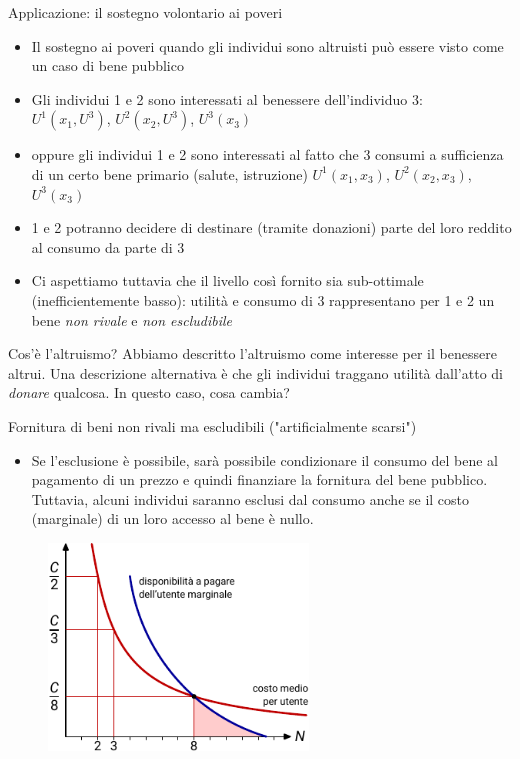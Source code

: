\documentclass[aspectratio=64,11pt]{beamer}
\begin{document}
\begin{frame}{Applicazione: il sostegno volontario ai poveri}
\begin{itemize}
\item Il sostegno ai poveri quando gli individui sono altruisti può essere visto
come un caso di bene pubblico
\item Gli individui 1 e 2 sono interessati al benessere dell'individuo 3:\\[0pt]
$U^1(x_1,U^3)$, $U^2(x_2,U^3)$, $U^3(x_3)$
\item oppure gli individui 1 e 2 sono interessati al fatto che 3 consumi a
sufficienza di un certo bene primario (salute, istruzione)
$U^1(x_1,x_3)$, $U^2(x_2,x_3)$, $U^3(x_3)$
\item 1 e 2 potranno decidere di destinare (tramite donazioni) parte del loro
reddito al consumo da parte di 3
\item Ci aspettiamo tuttavia che il livello così fornito sia sub-ottimale
(inefficientemente basso): utilità e consumo di 3 rappresentano per 1 e 2 un
bene \emph{non rivale} e \emph{non escludibile}
\end{itemize}

\begin{block}{Cos'è l'altruismo?}
Abbiamo descritto l'altruismo come interesse per il benessere altrui.  Una
descrizione alternativa è che gli individui traggano utilità dall'atto di
\emph{donare} qualcosa.  In questo caso, cosa cambia?
\end{block}
\end{frame}

\begin{frame}{Fornitura di beni non rivali ma escludibili ("artificialmente scarsi")}
\begin{itemize}
\item Se l'esclusione è possibile, sarà possibile condizionare il consumo del bene
al pagamento di un prezzo e quindi finanziare la fornitura del bene
pubblico.  Tuttavia, alcuni individui saranno esclusi dal consumo anche se
il costo (marginale) di un loro accesso al bene è nullo.
\end{itemize}
\begin{figure}[htbp]
\centering
\includegraphics[height=5.5cm]{./figure/beni-pubblici-escludibili-1-color.pdf}
\end{figure}
\end{frame}
\end{document}
